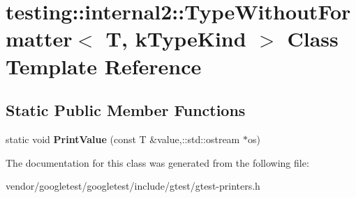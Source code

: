 \hypertarget{classtesting_1_1internal2_1_1TypeWithoutFormatter}{}\section{testing\+:\+:internal2\+:\+:Type\+Without\+Formatter$<$ T, k\+Type\+Kind $>$ Class Template Reference}
\label{classtesting_1_1internal2_1_1TypeWithoutFormatter}
\subsection*{Static Public Member Functions}
\begin{DoxyCompactItemize}
\item 
static void {\bfseries Print\+Value} (const T \&value,\+::std\+::ostream $\ast$os)\hypertarget{classtesting_1_1internal2_1_1TypeWithoutFormatter_a6c377c9580fce3a0226911417053f417}{}\label{classtesting_1_1internal2_1_1TypeWithoutFormatter_a6c377c9580fce3a0226911417053f417}

\end{DoxyCompactItemize}


The documentation for this class was generated from the following file\+:\begin{DoxyCompactItemize}
\item 
vendor/googletest/googletest/include/gtest/gtest-\/printers.\+h\end{DoxyCompactItemize}
